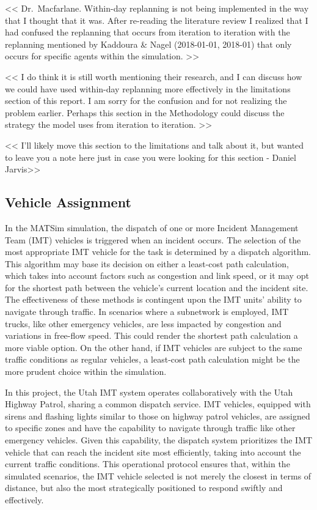 \documentclass[fancy, oneside, mastersfancy, ms]{byuthesis}
\begin{document}
\textless\textless{} Dr.~Macfarlane. Within-day replanning is not being
implemented in the way that I thought that it was. After re-reading the
literature review I realized that I had confused the replanning that
occurs from iteration to iteration with the replanning mentioned by
Kaddoura \& Nagel (2018-01-01, 2018-01) that only occurs for specific
agents within the simulation. \textgreater\textgreater{}

\textless\textless{} I do think it is still worth mentioning their
research, and I can discuss how we could have used within-day replanning
more effectively in the limitations section of this report. I am sorry
for the confusion and for not realizing the problem earlier. Perhaps
this section in the Methodology could discuss the strategy the model
uses from iteration to iteration. \textgreater\textgreater{}

\textless\textless{} I'll likely move this section to the limitations
and talk about it, but wanted to leave you a note here just in case you
were looking for this section - Daniel Jarvis\textgreater\textgreater{}

\hypertarget{vehicle-assignment}{%
\subsection{Vehicle Assignment}\label{vehicle-assignment}}

In the MATSim simulation, the dispatch of one or more Incident
Management Team (IMT) vehicles is triggered when an incident occurs. The
selection of the most appropriate IMT vehicle for the task is determined
by a dispatch algorithm. This algorithm may base its decision on either
a least-cost path calculation, which takes into account factors such as
congestion and link speed, or it may opt for the shortest path between
the vehicle's current location and the incident site. The effectiveness
of these methods is contingent upon the IMT units' ability to navigate
through traffic. In scenarios where a subnetwork is employed, IMT
trucks, like other emergency vehicles, are less impacted by congestion
and variations in free-flow speed. This could render the shortest path
calculation a more viable option. On the other hand, if IMT vehicles are
subject to the same traffic conditions as regular vehicles, a least-cost
path calculation might be the more prudent choice within the simulation.

In this project, the Utah IMT system operates collaboratively with the
Utah Highway Patrol, sharing a common dispatch service. IMT vehicles,
equipped with sirens and flashing lights similar to those on highway
patrol vehicles, are assigned to specific zones and have the capability
to navigate through traffic like other emergency vehicles. Given this
capability, the dispatch system prioritizes the IMT vehicle that can
reach the incident site most efficiently, taking into account the
current traffic conditions. This operational protocol ensures that,
within the simulated scenarios, the IMT vehicle selected is not merely
the closest in terms of distance, but also the most strategically
positioned to respond swiftly and effectively.
\end{document}
